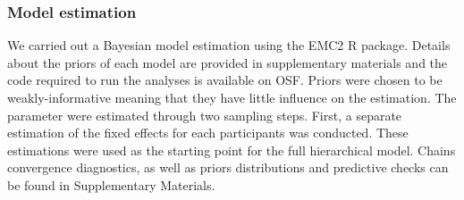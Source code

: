\documentclass[
  letterpaper,
  DIV=11,
  numbers=noendperiod]{scrartcl}
\newcounter{none} %
\begin{document}
\begin{table}

\caption{\label{tbl-model-formula}Formula specification for the
pre-registered linear ballistic accumulator model.}


\end{table}%

\subsubsection{Model estimation}\label{model-estimation}

We carried out a Bayesian model estimation using the EMC2 R package.
Details about the priors of each model are provided in supplementary
materials and the code required to run the analyses is available on OSF.
Priors were chosen to be weakly-informative meaning that they have
little influence on the estimation. The parameter were estimated through
two sampling steps. First, a separate estimation of the fixed effects
for each participants was conducted. These estimations were used as the
starting point for the full hierarchical model. Chains convergence
diagnostics, as well as priors distributions and predictive checks can
be found in Supplementary Materials.
\end{document}
